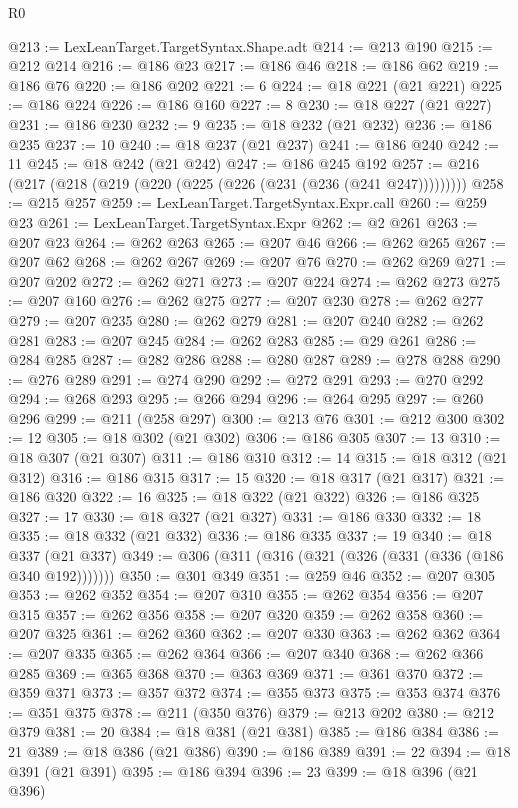 \begin{lexlean}{R0}
\begin{coremodule}
@213 := LexLeanTarget.TargetSyntax.Shape.adt
@214 := @213 @190
@215 := @212 @214
@216 := @186 @23
@217 := @186 @46
@218 := @186 @62
@219 := @186 @76
@220 := @186 @202
@221 := 6
@224 := @18 @221 (@21 @221)
@225 := @186 @224
@226 := @186 @160
@227 := 8
@230 := @18 @227 (@21 @227)
@231 := @186 @230
@232 := 9
@235 := @18 @232 (@21 @232)
@236 := @186 @235
@237 := 10
@240 := @18 @237 (@21 @237)
@241 := @186 @240
@242 := 11
@245 := @18 @242 (@21 @242)
@247 := @186 @245 @192
@257 := @216 (@217 (@218 (@219 (@220 (@225 (@226 (@231 (@236 (@241 @247)))))))))
@258 := @215 @257
@259 := LexLeanTarget.TargetSyntax.Expr.call
@260 := @259 @23
@261 := LexLeanTarget.TargetSyntax.Expr
@262 := @2 @261
@263 := @207 @23
@264 := @262 @263
@265 := @207 @46
@266 := @262 @265
@267 := @207 @62
@268 := @262 @267
@269 := @207 @76
@270 := @262 @269
@271 := @207 @202
@272 := @262 @271
@273 := @207 @224
@274 := @262 @273
@275 := @207 @160
@276 := @262 @275
@277 := @207 @230
@278 := @262 @277
@279 := @207 @235
@280 := @262 @279
@281 := @207 @240
@282 := @262 @281
@283 := @207 @245
@284 := @262 @283
@285 := @29 @261
@286 := @284 @285
@287 := @282 @286
@288 := @280 @287
@289 := @278 @288
@290 := @276 @289
@291 := @274 @290
@292 := @272 @291
@293 := @270 @292
@294 := @268 @293
@295 := @266 @294
@296 := @264 @295
@297 := @260 @296
@299 := @211 (@258 @297)
@300 := @213 @76
@301 := @212 @300
@302 := 12
@305 := @18 @302 (@21 @302)
@306 := @186 @305
@307 := 13
@310 := @18 @307 (@21 @307)
@311 := @186 @310
@312 := 14
@315 := @18 @312 (@21 @312)
@316 := @186 @315
@317 := 15
@320 := @18 @317 (@21 @317)
@321 := @186 @320
@322 := 16
@325 := @18 @322 (@21 @322)
@326 := @186 @325
@327 := 17
@330 := @18 @327 (@21 @327)
@331 := @186 @330
@332 := 18
@335 := @18 @332 (@21 @332)
@336 := @186 @335
@337 := 19
@340 := @18 @337 (@21 @337)
@349 := @306 (@311 (@316 (@321 (@326 (@331 (@336 (@186 @340 @192)))))))
@350 := @301 @349
@351 := @259 @46
@352 := @207 @305
@353 := @262 @352
@354 := @207 @310
@355 := @262 @354
@356 := @207 @315
@357 := @262 @356
@358 := @207 @320
@359 := @262 @358
@360 := @207 @325
@361 := @262 @360
@362 := @207 @330
@363 := @262 @362
@364 := @207 @335
@365 := @262 @364
@366 := @207 @340
@368 := @262 @366 @285
@369 := @365 @368
@370 := @363 @369
@371 := @361 @370
@372 := @359 @371
@373 := @357 @372
@374 := @355 @373
@375 := @353 @374
@376 := @351 @375
@378 := @211 (@350 @376)
@379 := @213 @202
@380 := @212 @379
@381 := 20
@384 := @18 @381 (@21 @381)
@385 := @186 @384
@386 := 21
@389 := @18 @386 (@21 @386)
@390 := @186 @389
@391 := 22
@394 := @18 @391 (@21 @391)
@395 := @186 @394
@396 := 23
@399 := @18 @396 (@21 @396)

\end{coremodule}
\end{lexlean}
